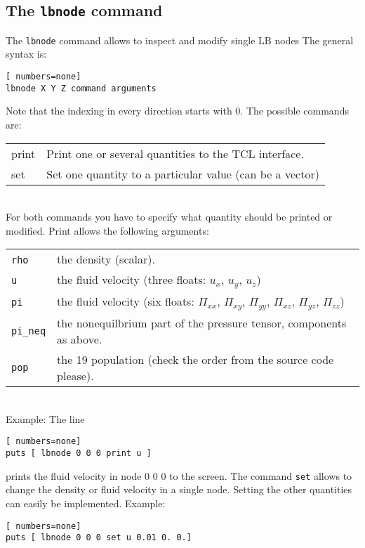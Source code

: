 \subsection*{The \lstinline|lbnode| command}
The \lstinline|lbnode| command allows to inspect and modify single LB nodes The
general syntax is:
\vspace{0,2cm}
\begin{lstlisting}[ numbers=none]
lbnode X Y Z command arguments
\end{lstlisting}
\vspace{0,2cm}
Note that the indexing in every direction starts with 0. The possible commands are:
\vspace{0,8cm}
\begin{tabular}{p{}p{}}
  print & Print one or several quantities to the TCL interface.\\
  set & Set one quantity to a particular value (can be a vector)\\
\end{tabular}\\
\vspace{0,8cm}
For both commands you have to specify what quantity should be printed
or modified. Print allows the following arguments: \\


\vspace{0,8cm}
\begin{tabular}{p{}p{}}
  \lstinline|rho|\ & the density (scalar). \\
  \lstinline|u| & the fluid velocity (three floats: $u_x$, $u_y$, $u_z$) \\
  \lstinline|pi| & the fluid velocity (six floats: $\Pi_{xx}$, $\Pi_{xy}$, $\Pi_{yy}$, $\Pi_{xz}$,  $\Pi_{yz}$,  $\Pi_{zz}$) \\
  \lstinline|pi_neq| & the nonequilbrium part of the pressure tensor, components as above. \\
  \lstinline|pop| & the 19 population (check the order from the source code please).
\end{tabular} \\
\vspace{0,8cm}
Example:
The line
\vspace{0,2cm}
\begin{lstlisting}[ numbers=none]
puts [ lbnode 0 0 0 print u ]
\end{lstlisting}
\vspace{0,2cm}
prints the fluid velocity in node 0 0 0 to the screen.
The command \lstinline|set| allows to change the density or fluid velocity in a single node. Setting
the other quantities can easily be implemented.
Example:
\begin{lstlisting}[ numbers=none]
puts [ lbnode 0 0 0 set u 0.01 0. 0.]
\end{lstlisting}
